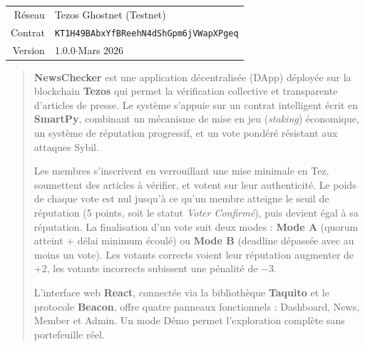 \documentclass[12pt,a4paper]{article}
\newcommand{\tezos}{\textcolor{primary}{\textbf{Tezos}}}
\newcommand{\smartpy}{\textcolor{accent}{\textbf{SmartPy}}}
\newcommand{\reactjs}{\textcolor{success}{\textbf{React}}}
\newcommand{\taquito}{\textcolor{warning}{\textbf{Taquito}}}
\newcommand{\beacon}{\textcolor{primary}{\textbf{Beacon}}}
\begin{document}
\begin{titlepage}
\begin{center}
{\small\color{darkbg!55}
  \begin{tabular}{r@{\hspace{0.5em}:\hspace{0.7em}}l}
    Réseau  & Tezos Ghostnet (Testnet) \\[0.25em]
    Contrat & \texttt{KT1H49BAbxYfBReehN4dShGpm6jVWapXPgeq} \\[0.25em]
    Version & 1.0.0\quad$\cdot$\quad Mars 2026 \\
  \end{tabular}}

\end{center}


\restoregeometry
\end{titlepage}

\newpage
\begin{abstract}
\noindent
\textbf{NewsChecker} est une application décentralisée (DApp) déployée sur la blockchain \tezos{} qui permet la vérification collective et transparente d'articles de presse. Le système s'appuie sur un contrat intelligent écrit en \smartpy{}, combinant un mécanisme de mise en jeu (\emph{staking}) économique, un système de réputation progressif, et un vote pondéré résistant aux attaques Sybil.

Les membres s'inscrivent en verrouillant une mise minimale en Tez, soumettent des articles à vérifier, et votent sur leur authenticité. Le poids de chaque vote est nul jusqu'à ce qu'un membre atteigne le seuil de réputation (5 points, soit le statut \emph{Voter Confirmé}), puis devient égal à sa réputation. La finalisation d'un vote suit deux modes : \textbf{Mode A} (quorum atteint + délai minimum écoulé) ou \textbf{Mode B} (deadline dépassée avec au moins un vote). Les votants corrects voient leur réputation augmenter de $+2$, les votants incorrects subissent une pénalité de $-3$.

L'interface web \reactjs{}, connectée via la bibliothèque \taquito{} et le protocole \beacon{}, offre quatre panneaux fonctionnels : Dashboard, News, Member et Admin. Un mode Démo permet l'exploration complète sans portefeuille réel.
\end{abstract}
\end{document}
